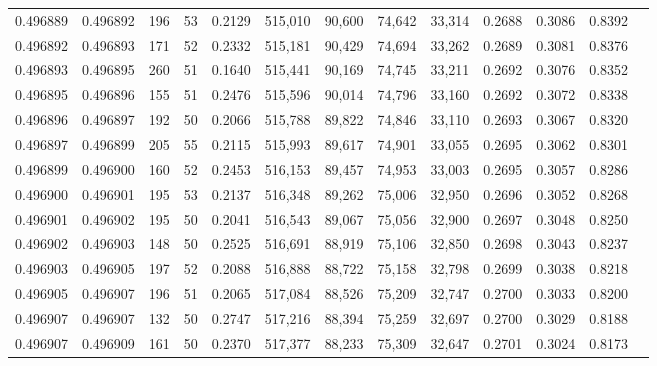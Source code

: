 \begin{tabular}{rrrrrrrrrrrrr}
0.496889 & 0.496892 &   196 &  53 &                                     0.2129 & 515,010 &  90,600 &  74,642 &  33,314 & 0.2688 & 0.3086 & 0.8392 \\
0.496892 & 0.496893 &   171 &  52 &                                     0.2332 & 515,181 &  90,429 &  74,694 &  33,262 & 0.2689 & 0.3081 & 0.8376 \\
0.496893 & 0.496895 &   260 &  51 &                                     0.1640 & 515,441 &  90,169 &  74,745 &  33,211 & 0.2692 & 0.3076 & 0.8352 \\
0.496895 & 0.496896 &   155 &  51 &                                     0.2476 & 515,596 &  90,014 &  74,796 &  33,160 & 0.2692 & 0.3072 & 0.8338 \\
0.496896 & 0.496897 &   192 &  50 &                                     0.2066 & 515,788 &  89,822 &  74,846 &  33,110 & 0.2693 & 0.3067 & 0.8320 \\
0.496897 & 0.496899 &   205 &  55 &                                     0.2115 & 515,993 &  89,617 &  74,901 &  33,055 & 0.2695 & 0.3062 & 0.8301 \\
0.496899 & 0.496900 &   160 &  52 &                                     0.2453 & 516,153 &  89,457 &  74,953 &  33,003 & 0.2695 & 0.3057 & 0.8286 \\
0.496900 & 0.496901 &   195 &  53 &                                     0.2137 & 516,348 &  89,262 &  75,006 &  32,950 & 0.2696 & 0.3052 & 0.8268 \\
0.496901 & 0.496902 &   195 &  50 &                                     0.2041 & 516,543 &  89,067 &  75,056 &  32,900 & 0.2697 & 0.3048 & 0.8250 \\
0.496902 & 0.496903 &   148 &  50 &                                     0.2525 & 516,691 &  88,919 &  75,106 &  32,850 & 0.2698 & 0.3043 & 0.8237 \\
0.496903 & 0.496905 &   197 &  52 &                                     0.2088 & 516,888 &  88,722 &  75,158 &  32,798 & 0.2699 & 0.3038 & 0.8218 \\
0.496905 & 0.496907 &   196 &  51 &                                     0.2065 & 517,084 &  88,526 &  75,209 &  32,747 & 0.2700 & 0.3033 & 0.8200 \\
0.496907 & 0.496907 &   132 &  50 &                                     0.2747 & 517,216 &  88,394 &  75,259 &  32,697 & 0.2700 & 0.3029 & 0.8188 \\
0.496907 & 0.496909 &   161 &  50 &                                     0.2370 & 517,377 &  88,233 &  75,309 &  32,647 & 0.2701 & 0.3024 & 0.8173 \\

\end{tabular}
